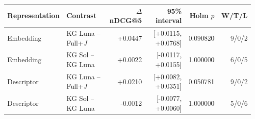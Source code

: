\begin{tabular}{@{}llrrrr@{}}
\toprule
Representation & Contrast & $\Delta$ nDCG@5 & 95\% interval & Holm $p$ & W/T/L \\
\midrule
Embedding & KG Luna -- Full+$J$ & +0.0447 & [+0.0115, +0.0768] & 0.090820 & 9/0/2 \\
Embedding & KG Sol -- KG Luna & +0.0022 & [-0.0117, +0.0155] & 1.000000 & 6/0/5 \\
Descriptor & KG Luna -- Full+$J$ & +0.0210 & [+0.0082, +0.0351] & 0.050781 & 9/0/2 \\
Descriptor & KG Sol -- KG Luna & -0.0012 & [-0.0077, +0.0060] & 1.000000 & 5/0/6 \\
\bottomrule
\end{tabular}
